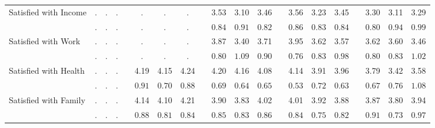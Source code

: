 \begin{center}
{\begin{longtable}{L{5cm} c c c p{.5cm} c c c p{.5cm} c c c p{.5cm} c c c p{.5cm} c c c}
 \quad Satisfied with Income & . &         . &         . & &         . &         . &         . & &      3.53 &      3.10 &      3.46 & &      3.56 &      3.23 &      3.45 & &      3.30 &      3.11 &      3.29 \\*
 \quad & $\mathit{        .}$ & $\mathit{        .}$ & $\mathit{        .}$ & & $\mathit{        .}$ & $\mathit{        .}$ & $\mathit{        .}$ & & $\mathit{     0.84}$ & $\mathit{     0.91}$ & $\mathit{     0.82}$ & & $\mathit{     0.86}$ & $\mathit{     0.83}$ & $\mathit{     0.84}$ & & $\mathit{     0.80}$ & $\mathit{     0.94}$ & $\mathit{     0.99}$ \\[.2em]
 \quad Satisfied with Work & . &         . &         . & &         . &         . &         . & &      3.87 &      3.40 &      3.71 & &      3.95 &      3.62 &      3.57 & &      3.62 &      3.60 &      3.46 \\*
 \quad & $\mathit{        .}$ & $\mathit{        .}$ & $\mathit{        .}$ & & $\mathit{        .}$ & $\mathit{        .}$ & $\mathit{        .}$ & & $\mathit{     0.80}$ & $\mathit{     1.09}$ & $\mathit{     0.90}$ & & $\mathit{     0.76}$ & $\mathit{     0.83}$ & $\mathit{     0.98}$ & & $\mathit{     0.80}$ & $\mathit{     0.83}$ & $\mathit{     1.02}$ \\[.2em]
 \quad Satisfied with Health & . &         . &         . & &      4.19 &      4.15 &      4.24 & &      4.20 &      4.16 &      4.08 & &      4.14 &      3.91 &      3.96 & &      3.79 &      3.42 &      3.58 \\*
 \quad & $\mathit{        .}$ & $\mathit{        .}$ & $\mathit{        .}$ & & $\mathit{     0.91}$ & $\mathit{     0.70}$ & $\mathit{     0.88}$ & & $\mathit{     0.69}$ & $\mathit{     0.64}$ & $\mathit{     0.65}$ & & $\mathit{     0.53}$ & $\mathit{     0.72}$ & $\mathit{     0.63}$ & & $\mathit{     0.67}$ & $\mathit{     0.76}$ & $\mathit{     1.08}$ \\[.2em]
 \quad Satisfied with Family & . &         . &         . & &      4.14 &      4.10 &      4.21 & &      3.90 &      3.83 &      4.02 & &      4.01 &      3.92 &      3.88 & &      3.87 &      3.80 &      3.94 \\*
 \quad & $\mathit{        .}$ & $\mathit{        .}$ & $\mathit{        .}$ & & $\mathit{     0.88}$ & $\mathit{     0.81}$ & $\mathit{     0.84}$ & & $\mathit{     0.85}$ & $\mathit{     0.83}$ & $\mathit{     0.86}$ & & $\mathit{     0.84}$ & $\mathit{     0.75}$ & $\mathit{     0.82}$ & & $\mathit{     0.91}$ & $\mathit{     0.73}$ & $\mathit{     0.97}$ \\[.2em]

\end{longtable}}
\end{center}
